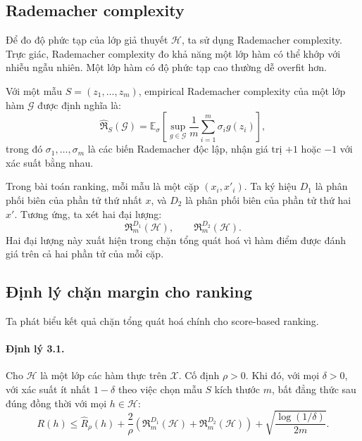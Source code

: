 \subsection{Rademacher complexity}

Để đo độ phức tạp của lớp giả thuyết \(\mathcal{H}\), ta sử dụng Rademacher complexity. Trực giác, Rademacher complexity đo khả năng một lớp hàm có thể khớp với nhiễu ngẫu nhiên. Một lớp hàm có độ phức tạp cao thường dễ overfit hơn.

Với một mẫu \(S=(z_1,\ldots,z_m)\), empirical Rademacher complexity của một lớp hàm \(\mathcal{G}\) được định nghĩa là:
\begin{equation}
    \widehat{\mathfrak{R}}_{S}(\mathcal{G})
    =
    \mathbb{E}_{\sigma}
    \left[
        \sup_{g\in\mathcal{G}}
        \frac{1}{m}
        \sum_{i=1}^{m}
        \sigma_i g(z_i)
    \right],
    \label{eq:section3-empirical-rademacher}
\end{equation}
trong đó \(\sigma_1,\ldots,\sigma_m\) là các biến Rademacher độc lập, nhận giá trị \(+1\) hoặc \(-1\) với xác suất bằng nhau.

Trong bài toán ranking, mỗi mẫu là một cặp \((x_i,x'_i)\). Ta ký hiệu \(D_1\) là phân phối biên của phần tử thứ nhất \(x\), và \(D_2\) là phân phối biên của phần tử thứ hai \(x'\). Tương ứng, ta xét hai đại lượng:
\[
    \mathfrak{R}^{D_1}_m(\mathcal{H}),
    \qquad
    \mathfrak{R}^{D_2}_m(\mathcal{H}).
\]
Hai đại lượng này xuất hiện trong chặn tổng quát hoá vì hàm điểm được đánh giá trên cả hai phần tử của mỗi cặp.

\subsection{Định lý chặn margin cho ranking}

Ta phát biểu kết quả chặn tổng quát hoá chính cho score-based ranking.

\paragraph{Định lý 3.1.}
Cho \(\mathcal{H}\) là một lớp các hàm thực trên \(\mathcal{X}\). Cố định \(\rho>0\). Khi đó, với mọi \(\delta>0\), với xác suất ít nhất \(1-\delta\) theo việc chọn mẫu \(S\) kích thước \(m\), bất đẳng thức sau đúng đồng thời với mọi \(h\in\mathcal{H}\):
\begin{equation}
    R(h)
    \leq
    \widehat{R}_{\rho}(h)
    +
    \frac{2}{\rho}
    \left(
        \mathfrak{R}^{D_1}_m(\mathcal{H})
        +
        \mathfrak{R}^{D_2}_m(\mathcal{H})
    \right)
    +
    \sqrt{
        \frac{\log(1/\delta)}{2m}
    }.
    \label{eq:section3-margin-bound-expected}
\end{equation}

